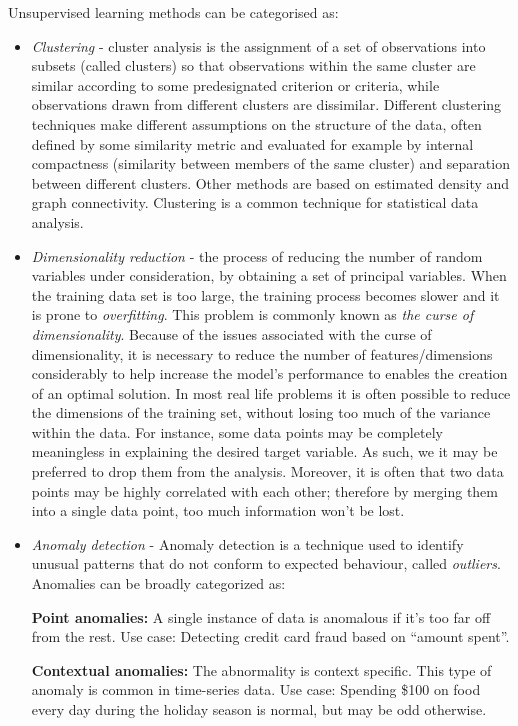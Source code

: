 \documentclass[12pt,a4paper]{article}
\begin{document}
Unsupervised learning methods can be categorised as:
\begin{itemize}
    \item \textit{Clustering} - cluster analysis is the assignment of a set of observations into subsets (called clusters) so that observations within the same cluster are similar according to some predesignated criterion or criteria, while observations drawn from different clusters are dissimilar. Different clustering techniques make different assumptions on the structure of the data, often defined by some similarity metric and evaluated for example by internal compactness (similarity between members of the same cluster) and separation between different clusters. Other methods are based on estimated density and graph connectivity. Clustering is a common technique for statistical data analysis.
    \item \textit{Dimensionality reduction} - the process of reducing the number of random variables under consideration, by obtaining a set of principal variables. When the training data set is too large, the training process becomes slower and it is prone to \textit{overfitting}. This problem is commonly known as \textit{the curse of dimensionality}. Because of the issues associated with the curse of dimensionality, it is necessary to reduce the number of features/dimensions considerably to help increase the model’s performance to enables the creation of an optimal solution. In most real life problems it is often possible to reduce the dimensions of the training set, without losing too much of the variance within the data.
    For instance, some data points may be completely meaningless in explaining the desired target variable. As such, we it may be preferred to drop them from the analysis. Moreover, it is often that two data points may be highly correlated with each other; therefore by merging them into a single data point, too much information won't be lost.
    \item \textit{Anomaly detection} - Anomaly detection is a technique used to identify unusual patterns that do not conform to expected behaviour, called \textit{outliers}. Anomalies can be broadly categorized as:

    \textbf{Point anomalies:} A single instance of data is anomalous if it's too far off from the rest. Use case: Detecting credit card fraud based on \enquote{amount spent}.

    \textbf{Contextual anomalies:} The abnormality is context specific. This type of anomaly is common in time-series data. Use case: Spending \$100 on food every day during the holiday season is normal, but may be odd otherwise.


\end{itemize}
\end{document}
